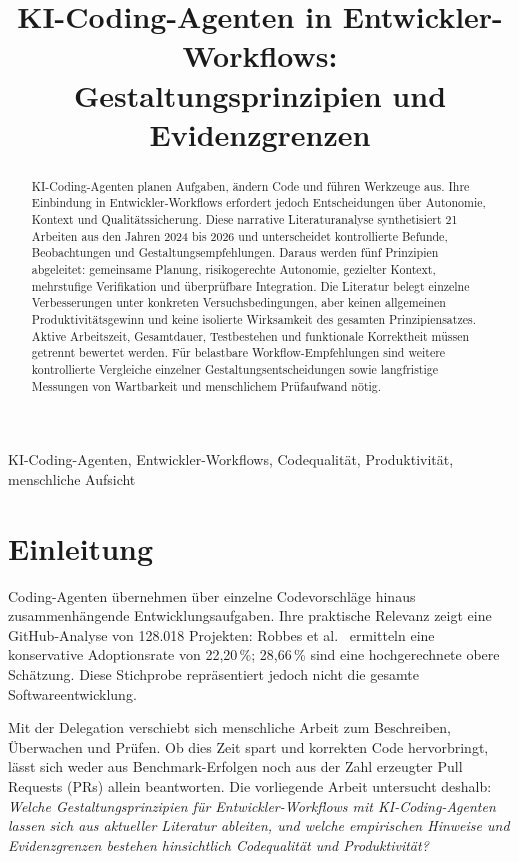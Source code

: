 \documentclass[conference]{IEEEtran}
\title{KI-Coding-Agenten in Entwickler-Workflows:\\Gestaltungsprinzipien und Evidenzgrenzen}
\author{\IEEEauthorblockN{Anonymisierte Fassung}}
\author{
\IEEEauthorblockN{Matej Vidakovic}
\IEEEauthorblockA{Informatik\\Duale Hochschule Baden-Württemberg}
\and
\IEEEauthorblockN{Malik Haase}
\IEEEauthorblockA{Informatik\\Duale Hochschule Baden-Württemberg}
\and
\IEEEauthorblockN{Sergiu Paculea}
\IEEEauthorblockA{Informatik\\Duale Hochschule Baden-Württemberg}}
\begin{document}
\maketitle
\begin{abstract}
KI-Coding-Agenten planen Aufgaben, ändern Code und führen Werkzeuge aus. Ihre Einbindung in Entwickler-Workflows erfordert jedoch Entscheidungen über Autonomie, Kontext und Qualitätssicherung. Diese narrative Literaturanalyse synthetisiert 21 Arbeiten aus den Jahren 2024 bis 2026 und unterscheidet kontrollierte Befunde, Beobachtungen und Gestaltungsempfehlungen. Daraus werden fünf Prinzipien abgeleitet: gemeinsame Planung, risikogerechte Autonomie, gezielter Kontext, mehrstufige Verifikation und überprüfbare Integration. Die Literatur belegt einzelne Verbesserungen unter konkreten Versuchsbedingungen, aber keinen allgemeinen Produktivitätsgewinn und keine isolierte Wirksamkeit des gesamten Prinzipiensatzes. Aktive Arbeitszeit, Gesamtdauer, Testbestehen und funktionale Korrektheit müssen getrennt bewertet werden. Für belastbare Workflow-Empfehlungen sind weitere kontrollierte Vergleiche einzelner Gestaltungsentscheidungen sowie langfristige Messungen von Wartbarkeit und menschlichem Prüfaufwand nötig.
\end{abstract}
\begin{IEEEkeywords}
KI-Coding-Agenten, Entwickler-Workflows, Codequalität, Produktivität, menschliche Aufsicht
\end{IEEEkeywords}

\section{Einleitung}
Coding-Agenten übernehmen über einzelne Codevorschläge hinaus zusammenhängende Entwicklungsaufgaben. Ihre praktische Relevanz zeigt eine GitHub-Analyse von 128.018 Projekten: Robbes et al.~\cite{robbes2026agenticmuch} ermitteln eine konservative Adoptionsrate von 22,20\,\%; 28,66\,\% sind eine hochgerechnete obere Schätzung. Diese Stichprobe repräsentiert jedoch nicht die gesamte Softwareentwicklung.

Mit der Delegation verschiebt sich menschliche Arbeit zum Beschreiben, Überwachen und Prüfen. Ob dies Zeit spart und korrekten Code hervorbringt, lässt sich weder aus Benchmark-Erfolgen noch aus der Zahl erzeugter Pull Requests (PRs) allein beantworten. Die vorliegende Arbeit untersucht deshalb:
\emph{Welche Gestaltungsprinzipien für Entwickler-Workflows mit KI-Coding-Agenten lassen sich aus aktueller Literatur ableiten, und welche empirischen Hinweise und Evidenzgrenzen bestehen hinsichtlich Codequalität und Produktivität?}
\end{document}

